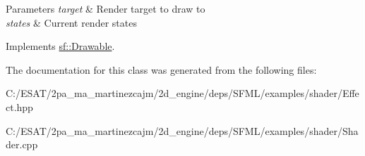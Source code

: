 \begin{DoxyParams}{Parameters}
{\em target} & Render target to draw to \\
\hline
{\em states} & Current render states \\
\hline
\end{DoxyParams}


Implements \hyperlink{classsf_1_1_drawable_a90d2c88bba9b035a0844eccb380ef631}{sf\+::\+Drawable}.



The documentation for this class was generated from the following files\+:\begin{DoxyCompactItemize}
\item 
C\+:/\+E\+S\+A\+T/2pa\+\_\+ma\+\_\+martinezcajm/2d\+\_\+engine/deps/\+S\+F\+M\+L/examples/shader/Effect.\+hpp\item 
C\+:/\+E\+S\+A\+T/2pa\+\_\+ma\+\_\+martinezcajm/2d\+\_\+engine/deps/\+S\+F\+M\+L/examples/shader/Shader.\+cpp\end{DoxyCompactItemize}
